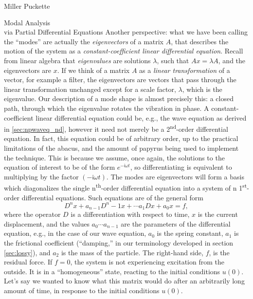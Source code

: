 \documentclass[a4paper,10pt]{report}
\numberwithin{equation}{section}
\begin{document}
\begin{chapter}{Miller Puckette}
\begin{section}{Modal Analysis \\via Partial Differential Equations}
Another perspective: what we have been calling the ``modes'' are actually the \emph{eigenvectors} of a matrix $A$, that describes the motion of the system as a \emph{constant-coefficient linear differential equation}. Recall from linear algebra that \emph{eigenvalues} are solutions $\lambda$, such that $Ax = \lambda A$, and the eigenvectors are $x$.\cite[p.~283]{Strang2009} If we think of a matrix $A$ as a \emph{linear transformation} of a vector, for example a filter, the eigenvectors are vectors that pass through the linear transformation unchanged except for a scale factor, $\lambda$, which is the eigenvalue. Our description of a mode shape is almost precisely this: a closed path, through which the eigenvalue rotates the vibration in phase. \cite[p.~8]{Marshall2004} A constant-coefficient linear differential equation could be, e.g., the wave equation as derived in \ref{sec:npwaveq_nd}, however it need not merely be a 2\textsuperscript{nd}-order differential equation. In fact, this equation could be of 
arbitrary order, up to the practical limitations of the abacus, and the amount of papyrus being used to implement the technique. This is because we assume, once again, the solutions to the equation of interest to be of the form $e^{-\mathsf{i}\omega t}$, so differentiating is equivalent to multiplying by the factor $(-\mathsf{i}\omega t)$. The modes are eigenvectors will form a basis which diagonalizes the single n\textsuperscript{th}-order differential equation into a system of n 1\textsuperscript{st}-order differential equations. Such equations are of the general form\cite[p.~16]{Reid1992}
\begin{equation}
D^n x + a_{n-1} D^n-1 x + \cdots a_1 Dx + a_0 x = f ,
\end{equation}
where the operator $D$ is a differentiation with respect to time, $x$ is the current displacement, and the values $a_0 \cdots a_{n-1}$ are the parameters of the differential equation, e.g., in the case of our wave equation, $a_0$ is the spring constant, $a_1$ is the frictional coefficient (``damping,'' in our terminology developed in section \ref{sec:lossy}), and $a_2$ is the mass of the particle. The right-hand side, $f$, is the residual force. If $f=0$, the system is not experiencing excitation from the outside. It is in a ``homogeneous'' state, reacting to the initial conditions $u(0)$. Let's say we wanted to know what this matrix would do after an arbitrarily long amount of time, in response to the initial conditions $u(0)$. 


\end{section}
\end{chapter}
\end{document}

